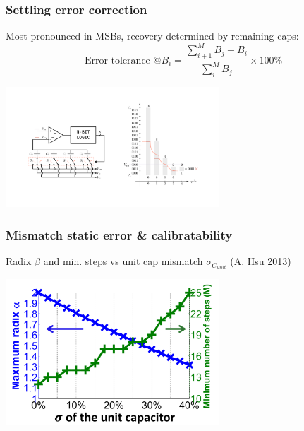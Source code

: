 \documentclass[aspectratio=169]{beamer}
\begin{document}
\begin{frame}
\frametitle{Settling error correction}
Most pronounced in MSBs, recovery determined by remaining caps:
\begin{equation*}
\textrm{Error tolerance @} B_i = \frac{\sum_{i+1}^{M}B_j - B_i} {\sum_{i}^{M}B_j} \times 100 \%
\end{equation*}
\begin{center}
\includegraphics[width=0.6\textwidth]{tranchar2.pdf}
\end{center}
\end{frame}

\begin{frame}
\frametitle{Mismatch static error \& calibratability}
  Radix $\beta$ and min. steps vs unit cap mismatch $\sigma_{C_{unit}}$ (A. Hsu 2013)
  \begin{center}
  \includegraphics[width=0.6\textwidth]{mismatch_vs_radix.png}
  \end{center}
\end{frame}


\end{document}
